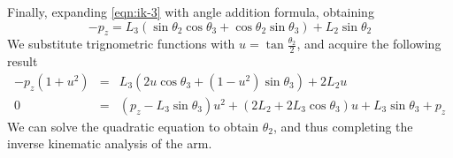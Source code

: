 \documentclass{article}
\begin{document}
Finally, expanding \autoref{eqn:ik-3} with angle addition formula, obtaining
\begin{equation*}
    - p_z = L_3 (\sin \theta_2 \cos \theta_3 + \cos \theta_2 \sin \theta_3) + L_2 \sin \theta_2
\end{equation*}
We substitute trignometric functions with $u = \tan \frac{\theta_2}{2}$, and acquire the following result
\begin{eqnarray*}
    - p_z (1 + u^2) &=& L_3 (2u \cos \theta_3 + (1 - u^2) \sin \theta_3) + 2 L_2 u \\
    0 &=& (p_z - L_3 \sin \theta_3) u^2 + (2 L_2 + 2 L_3 \cos \theta_3) u + L_3 \sin \theta_3 + p_z
\end{eqnarray*}
We can solve the quadratic equation to obtain $\theta_2$, and thus completing the inverse kinematic analysis of the arm.
\end{document}
